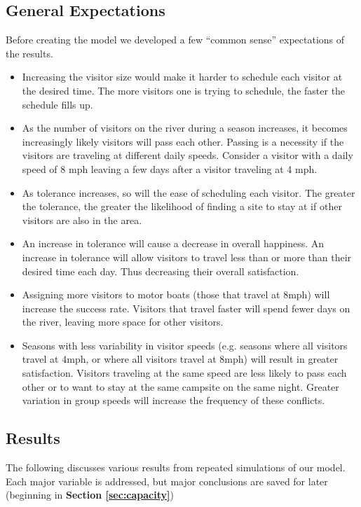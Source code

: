 \documentclass[11pt]{article} %
\begin{document}
\subsection{General Expectations}
\label{sec:expectations}
Before creating the model we developed a few ``common sense'' expectations of
the results.
\begin{itemize}
\item Increasing the visitor size
would make it harder to schedule each visitor at the desired time. The more
visitors one is trying to schedule, the faster the schedule fills up.

\item As the number of visitors on the river during a season increases, it
becomes increasingly likely visitors will pass each other. Passing
is a necessity if the visitors are traveling at different daily
speeds.  Consider a visitor with a daily speed of 8 mph leaving a few days
after a visitor traveling at 4 mph.

\item As tolerance increases, so will the ease of scheduling each visitor. The
greater the tolerance, the greater the likelihood of finding a site to stay
at if other visitors are also in the area.

\item An increase in tolerance will cause a decrease in overall happiness.
An increase in tolerance will allow visitors to travel less than or more
than their desired time each day. Thus decreasing their overall satisfaction.

\item Assigning more visitors to motor boats (those that travel
at 8mph) will increase the success rate. Visitors that travel faster will
spend fewer days on the river, leaving more space for other visitors.

\item Seasons with less variability in visitor speeds (e.g. seasons where
all visitors travel at 4mph, or where all visitors travel at 8mph) will result
in greater satisfaction. Visitors traveling at the same speed are less likely
to pass each other or to want to stay at the same campsite on the same night.
Greater variation in group speeds will increase the frequency of these
conflicts.
\end{itemize}

\subsection{Results}
\label{sec:results}
The following discusses various results from repeated simulations of our
model.  Each major variable is addressed, but major conclusions are saved for
later (beginning in \textbf{Section \ref{sec:capacity}})
\end{document}
